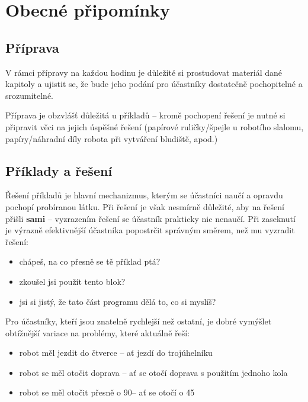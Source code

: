 \errata

\newpage

\section{Obecné připomínky}

\subsection{Příprava}
V rámci přípravy na každou hodinu je důležité si prostudovat materiál dané kapitoly a ujistit se, že bude jeho podání pro účastníky dostatečně pochopitelné a srozumitelné.

Příprava je obzvlášť důležitá u příkladů -- kromě pochopení řešení je nutné si připravit věci na jejich úspěšné řešení (papírové ruličky/špejle u robotího slalomu, papíry/náhradní díly robota při vytváření bludiště, apod.)

\subsection{Příklady a řešení}
Řešení příkladů je hlavní mechanizmus, kterým se účastníci naučí a opravdu pochopí probíranou látku. Při řešení je však nesmírně důležité, aby na řešení přišli \textbf{sami} -- vyzrazením řešení se účastník prakticky nic nenaučí. Při zaseknutí je výrazně efektivnější účastníka popostrčit správným směrem, než mu vyzradit řešení:
\begin{itemize}
	\item chápeš, na co přesně se tě příklad ptá?
	\item zkoušel jsi použít tento blok?
	\item jsi si jistý, že tato část programu dělá to, co si myslíš?
\end{itemize}

\vspace{\baselineskip}

Pro účastníky, kteří jsou znatelně rychlejší než ostatní, je dobré vymýšlet obtížnější variace na problémy, které aktuálně řeší:
\begin{itemize}
	\item robot měl jezdit do čtverce -- ať jezdí do trojúhelníku
	\item robot se měl otočit doprava -- ať se otočí doprava s použitím jednoho kola
	\item robot se měl otočit přesně o 90\degree -- ať se otočí o 45\degree
\end{itemize}

